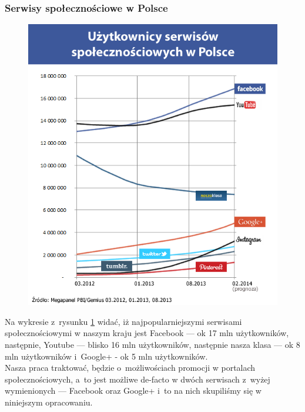 
\subsubsection{Serwisy społecznościowe w Polsce}

\begin{figure}[!h]
\centering
    \scalebox{0.5}
    {
        \includegraphics{images/lukasz/analiza.png}
    }
    \label{fig:uzytkownicy-mediow-spolecznosciowych-w-polsce}
\end{figure}


Na wykresie z~rysunku \ref{fig:uzytkownicy-mediow-spolecznosciowych-w-polsce} widać, iż najpopularniejszymi serwisami społecznościowymi w naszym kraju jest Facebook --- ok 17 mln użytkowników, następnie, Youtube --- blisko 16 mln użytkowników, następnie nasza klasa --- ok 8 mln użytkowników i~Google+ - ok 5 mln użytkowników.\\

Nasza praca traktować, będzie o~możliwościach promocji w portalach społecznościowych, a~to jest możliwe de-facto w dwóch serwisach z~wyżej wymienionych --- Facebook oraz Google+ i~to na nich skupiliśmy się w niniejszym opracowaniu.

